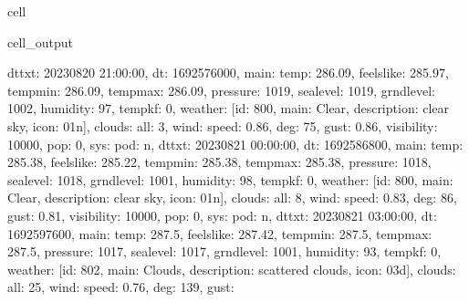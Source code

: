 \documentclass[letterpaper,10pt,english]{jupyterBook}
\begin{document}
\begin{sphinxuseclass}{cell}
\begin{sphinxVerbatimOutput}
\begin{sphinxuseclass}{cell_output}
\begin{sphinxVerbatim}[commandchars=\\\{\}]
\PYGZsq{}dt\PYGZus{}txt\PYGZsq{}: \PYGZsq{}2023\PYGZhy{}08\PYGZhy{}20 21:00:00\PYGZsq{}\PYGZcb{}, \PYGZob{}\PYGZsq{}dt\PYGZsq{}: 1692576000, \PYGZsq{}main\PYGZsq{}: \PYGZob{}\PYGZsq{}temp\PYGZsq{}: 286.09, \PYGZsq{}feels\PYGZus{}like\PYGZsq{}: 285.97, \PYGZsq{}temp\PYGZus{}min\PYGZsq{}: 286.09, \PYGZsq{}temp\PYGZus{}max\PYGZsq{}: 286.09, \PYGZsq{}pressure\PYGZsq{}: 1019, \PYGZsq{}sea\PYGZus{}level\PYGZsq{}: 1019, \PYGZsq{}grnd\PYGZus{}level\PYGZsq{}: 1002, \PYGZsq{}humidity\PYGZsq{}: 97, \PYGZsq{}temp\PYGZus{}kf\PYGZsq{}: 0\PYGZcb{}, \PYGZsq{}weather\PYGZsq{}: [\PYGZob{}\PYGZsq{}id\PYGZsq{}: 800, \PYGZsq{}main\PYGZsq{}: \PYGZsq{}Clear\PYGZsq{}, \PYGZsq{}description\PYGZsq{}: \PYGZsq{}clear sky\PYGZsq{}, \PYGZsq{}icon\PYGZsq{}: \PYGZsq{}01n\PYGZsq{}\PYGZcb{}], \PYGZsq{}clouds\PYGZsq{}: \PYGZob{}\PYGZsq{}all\PYGZsq{}: 3\PYGZcb{}, \PYGZsq{}wind\PYGZsq{}: \PYGZob{}\PYGZsq{}speed\PYGZsq{}: 0.86, \PYGZsq{}deg\PYGZsq{}: 75, \PYGZsq{}gust\PYGZsq{}: 0.86\PYGZcb{}, \PYGZsq{}visibility\PYGZsq{}: 10000, \PYGZsq{}pop\PYGZsq{}: 0, \PYGZsq{}sys\PYGZsq{}: \PYGZob{}\PYGZsq{}pod\PYGZsq{}: \PYGZsq{}n\PYGZsq{}\PYGZcb{}, \PYGZsq{}dt\PYGZus{}txt\PYGZsq{}: \PYGZsq{}2023\PYGZhy{}08\PYGZhy{}21 00:00:00\PYGZsq{}\PYGZcb{}, \PYGZob{}\PYGZsq{}dt\PYGZsq{}: 1692586800, \PYGZsq{}main\PYGZsq{}: \PYGZob{}\PYGZsq{}temp\PYGZsq{}: 285.38, \PYGZsq{}feels\PYGZus{}like\PYGZsq{}: 285.22, \PYGZsq{}temp\PYGZus{}min\PYGZsq{}: 285.38, \PYGZsq{}temp\PYGZus{}max\PYGZsq{}: 285.38, \PYGZsq{}pressure\PYGZsq{}: 1018, \PYGZsq{}sea\PYGZus{}level\PYGZsq{}: 1018, \PYGZsq{}grnd\PYGZus{}level\PYGZsq{}: 1001, \PYGZsq{}humidity\PYGZsq{}: 98, \PYGZsq{}temp\PYGZus{}kf\PYGZsq{}: 0\PYGZcb{}, \PYGZsq{}weather\PYGZsq{}: [\PYGZob{}\PYGZsq{}id\PYGZsq{}: 800, \PYGZsq{}main\PYGZsq{}: \PYGZsq{}Clear\PYGZsq{}, \PYGZsq{}description\PYGZsq{}: \PYGZsq{}clear sky\PYGZsq{}, \PYGZsq{}icon\PYGZsq{}: \PYGZsq{}01n\PYGZsq{}\PYGZcb{}], \PYGZsq{}clouds\PYGZsq{}: \PYGZob{}\PYGZsq{}all\PYGZsq{}: 8\PYGZcb{}, \PYGZsq{}wind\PYGZsq{}: \PYGZob{}\PYGZsq{}speed\PYGZsq{}: 0.83, \PYGZsq{}deg\PYGZsq{}: 86, \PYGZsq{}gust\PYGZsq{}: 0.81\PYGZcb{}, \PYGZsq{}visibility\PYGZsq{}: 10000, \PYGZsq{}pop\PYGZsq{}: 0, \PYGZsq{}sys\PYGZsq{}: \PYGZob{}\PYGZsq{}pod\PYGZsq{}: \PYGZsq{}n\PYGZsq{}\PYGZcb{}, \PYGZsq{}dt\PYGZus{}txt\PYGZsq{}: \PYGZsq{}2023\PYGZhy{}08\PYGZhy{}21 03:00:00\PYGZsq{}\PYGZcb{}, \PYGZob{}\PYGZsq{}dt\PYGZsq{}: 1692597600, \PYGZsq{}main\PYGZsq{}: \PYGZob{}\PYGZsq{}temp\PYGZsq{}: 287.5, \PYGZsq{}feels\PYGZus{}like\PYGZsq{}: 287.42, \PYGZsq{}temp\PYGZus{}min\PYGZsq{}: 287.5, \PYGZsq{}temp\PYGZus{}max\PYGZsq{}: 287.5, \PYGZsq{}pressure\PYGZsq{}: 1017, \PYGZsq{}sea\PYGZus{}level\PYGZsq{}: 1017, \PYGZsq{}grnd\PYGZus{}level\PYGZsq{}: 1001, \PYGZsq{}humidity\PYGZsq{}: 93, \PYGZsq{}temp\PYGZus{}kf\PYGZsq{}: 0\PYGZcb{}, \PYGZsq{}weather\PYGZsq{}: [\PYGZob{}\PYGZsq{}id\PYGZsq{}: 802, \PYGZsq{}main\PYGZsq{}: \PYGZsq{}Clouds\PYGZsq{}, \PYGZsq{}description\PYGZsq{}: \PYGZsq{}scattered clouds\PYGZsq{}, \PYGZsq{}icon\PYGZsq{}: \PYGZsq{}03d\PYGZsq{}\PYGZcb{}], \PYGZsq{}clouds\PYGZsq{}: \PYGZob{}\PYGZsq{}all\PYGZsq{}: 25\PYGZcb{}, \PYGZsq{}wind\PYGZsq{}: \PYGZob{}\PYGZsq{}speed\PYGZsq{}: 0.76, \PYGZsq{}deg\PYGZsq{}: 139, \PYGZsq{}gust\PYGZsq{}: 
\end{sphinxVerbatim}
\end{sphinxuseclass}
\end{sphinxVerbatimOutput}
\end{sphinxuseclass}
\end{document}
